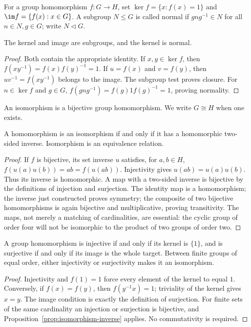 \begin{definition}
For a group homomorphism $f:G\to H$, set $\ker f=\{x:f(x)=1\}$ and $\im f=\{f(x):x\in G\}$. A subgroup $N\leq G$ is called normal if $gng^{-1}\in N$ for all $n\in N,g\in G$; write $N\mathrel{\triangleleft}G$.
\end{definition}
\begin{proposition}\label{prop:kernel-image}
The kernel and image are subgroups, and the kernel is normal.
\end{proposition}
\begin{proof}
Both contain the appropriate identity. If $x,y\in\ker f$, then $f(xy^{-1})=f(x)f(y)^{-1}=1$. If $u=f(x)$ and $v=f(y)$, then $uv^{-1}=f(xy^{-1})$ belongs to the image. The subgroup test proves closure. For $n\in\ker f$ and $g\in G$,
$f(gng^{-1})=f(g)1f(g)^{-1}=1$, proving normality.
\end{proof}

\begin{definition}
An isomorphism is a bijective group homomorphism. We write $G\cong H$ when one exists.
\end{definition}
\begin{proposition}\label{prop:isomorphism-inverse}
A homomorphism is an isomorphism if and only if it has a homomorphic two-sided inverse. Isomorphism is an equivalence relation.
\end{proposition}
\begin{proof}
If $f$ is bijective, its set inverse $u$ satisfies, for $a,b\in H$,
$f(u(a)u(b))=ab=f(u(ab))$. Injectivity gives $u(ab)=u(a)u(b)$. Thus its inverse is homomorphic. A map with a two-sided inverse is bijective by the definitions of injection and surjection. The identity map is a homomorphism; the inverse just constructed proves symmetry; the composite of two bijective homomorphisms is again bijective and multiplicative, proving transitivity. The maps, not merely a matching of cardinalities, are essential: the cyclic group of order four will not be isomorphic to the product of two groups of order two.
\end{proof}

\begin{proposition}\label{prop:injective-kernel}
A group homomorphism is injective if and only if its kernel is $\{1\}$, and is surjective if and only if its image is the whole target. Between finite groups of equal order, either injectivity or surjectivity makes it an isomorphism.
\end{proposition}
\begin{proof}
Injectivity and $f(1)=1$ force every element of the kernel to equal $1$. Conversely, if $f(x)=f(y)$, then $f(y^{-1}x)=1$; triviality of the kernel gives $x=y$. The image condition is exactly the definition of surjection. For finite sets of the same cardinality an injection or surjection is bijective, and Proposition~\ref{prop:isomorphism-inverse} applies. No commutativity is required.
\end{proof}


